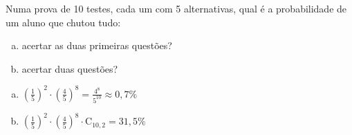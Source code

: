 \begin{ex}
Numa prova de 10 testes, cada um  com 5 alternativas, qual é a probabilidade de um aluno que chutou tudo:
   \begin{enumerate}[(a)]
   \item acertar as duas primeiras questões? 
   \item acertar duas questões? 
   \end{enumerate}
     \begin{sol}
       \phantom{A}
       \begin{enumerate} [(a)]
           \item $(\frac{1}{5})^2\cdot(\frac{4}{5})^8=\frac{4^8}{5^{10}}\approx 0,7\%$
           \item $(\frac{1}{5})^2\cdot(\frac{4}{5})^8\cdot\mathrm{C}_{{10},2}=31,5\%$
       \end{enumerate}
     \end{sol}
\end{ex}